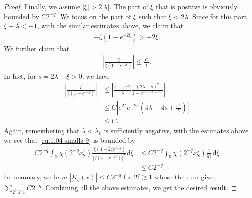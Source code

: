 \documentclass[../dissertation.tex]{subfiles}
\begin{document}
\begin{proof}
	Finally, we assume $|\xi| > 2 |\lambda|$. The part of $\xi$ that is positive is obviously
	bounded by $C2^{-q}$. We focus on the part of $\xi$ such that $\xi < 2 \lambda$. Since for 
	this part $\xi - \lambda < -1$, with the similar estimates above, we claim that
	\begin{align}
		-\zeta (1 - e^{-2\xi}) > -2 \xi.
	\end{align}
	We further claim that 
	\begin{align*}
		\left| \frac{\xi}{\zeta(1-e^{-2\xi})} \right|
			\leq \frac{C}{|\xi|}.
	\end{align*}
	In fact, for $s = 2 \lambda - \xi > 0$, we have
	\begin{align*}
		\left| \frac{\xi}{\zeta(1-e^{-2\xi})} \right|
			&\leq \left| 
					\frac{1-e^{-2\lambda}}{\lambda}
					\frac{(2\lambda-s)^2}{1 - e^{-2(2\lambda-s)}}
				\right| \\
			&\leq C \left|
					e^{2\lambda} e^{-2s} \left( 4\lambda - 4s + \frac{s^2}{\lambda} \right)
				\right| \\
			&\leq C.
	\end{align*}
	Again, remembering that $\lambda < \lambda_0$ is sufficiently negative, 
	with the estimates
	above we see that \eqref{eq:1.04-smallz-9} is bounded by 
	\begin{align*}
		C 2^{-q} 
		\int_{\mathbb R} 
			\chi\left( 2^{-q} x \xi \right) 
			\frac{|\xi\left(1-2\zeta e^{-2\xi}\right)}{\left|\zeta\left(1-e^{-2\xi}\right)\right|^2}
		\, \mathrm{d}\xi
			&\leq C 2^{-q} 
				\int_{\mathbb R} 
					\chi\left( 2^{-q} x \xi \right) \frac{1}{|\xi|} 
				\, \mathrm{d}\xi \\
			&\leq C 2^{-q}.
	\end{align*}
	In summary, we have $|K_q(x)| \leq C 2^{-q}$ for $2^{q} \gtrsim 1$ whose
	the sum gives $\displaystyle \sum_{2^q \gtrsim 1} C 2^{-q}$. Combining
	all the above estimates, we get the desired result.
\end{proof}
\end{document}
